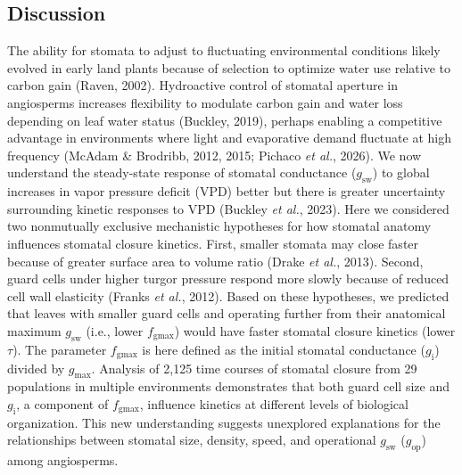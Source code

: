 \documentclass[
  letterpaper,
  DIV=11,
  numbers=noendperiod]{scrartcl}
\newcommand{\fgmax}{$f_\mathrm{gmax}$}
\newcommand{\gi}{$g_\mathrm{i}$}
\newcommand{\gmax}{$g_\mathrm{max}$}
\newcommand{\gop}{$g_\mathrm{op}$}
\newcommand{\gsw}{$g_\mathrm{sw}$}
\begin{document}
\subsection{Discussion}\label{discussion}

The ability for stomata to adjust to fluctuating environmental
conditions likely evolved in early land plants because of selection to
optimize water use relative to carbon gain (Raven, 2002). Hydroactive
control of stomatal aperture in angiosperms increases flexibility to
modulate carbon gain and water loss depending on leaf water status
(Buckley, 2019), perhaps enabling a competitive advantage in
environments where light and evaporative demand fluctuate at high
frequency (McAdam \& Brodribb, 2012, 2015; Pichaco \emph{et al.}, 2026).
We now understand the steady-state response of stomatal conductance
(\gsw) to global increases in vapor pressure deficit (VPD) better but
there is greater uncertainty surrounding kinetic responses to VPD
(Buckley \emph{et al.}, 2023). Here we considered two nonmutually
exclusive mechanistic hypotheses for how stomatal anatomy influences
stomatal closure kinetics. First, smaller stomata may close faster
because of greater surface area to volume ratio (Drake \emph{et al.},
2013). Second, guard cells under higher turgor pressure respond more
slowly because of reduced cell wall elasticity (Franks \emph{et al.},
2012). Based on these hypotheses, we predicted that leaves with smaller
guard cells and operating further from their anatomical maximum \gsw{}
(i.e., lower \fgmax) would have faster stomatal closure kinetics (lower
\(\tau\)). The parameter \fgmax{} is here defined as the initial
stomatal conductance (\gi) divided by \gmax. Analysis of 2,125 time
courses of stomatal closure from 29 populations in multiple environments
demonstrates that both guard cell size and \gi{}, a component of \fgmax,
influence kinetics at different levels of biological organization. This
new understanding suggests unexplored explanations for the relationships
between stomatal size, density, speed, and operational \gsw{} (\gop)
among angiosperms.
\end{document}
